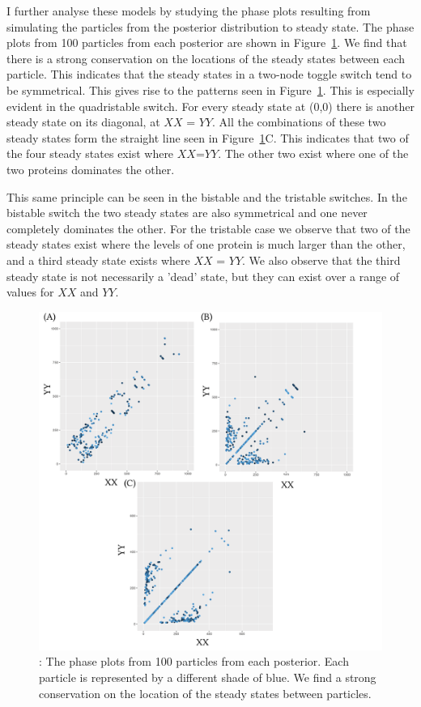 I further analyse these models by studying the phase plots resulting from simulating the particles from the posterior distribution to steady state. The phase plots from 100 particles from each posterior are shown in Figure~\ref{fig:lu_234_phase}. We find that there is a strong conservation on the locations of the steady states between each particle. This indicates that the steady states in a two-node toggle switch tend to be symmetrical. This gives rise to the patterns seen in Figure~\ref{fig:lu_234_phase}. This is especially evident in the quadristable switch.  For every steady state at (0,0) there is another steady state on its diagonal, at $XX$ = $YY$. All the combinations of these two steady states form the straight line seen in Figure~\ref{fig:lu_234_phase}C. This indicates that two of the four steady states exist where $XX$=$YY$. The other two exist where one of the two proteins dominates the other. 

This same principle can be seen in the bistable and the tristable switches. In the bistable switch the two steady states are also symmetrical and one never completely dominates the other. For the tristable case we observe that two of the steady states exist where the levels of one protein is much larger than the other, and a third steady state exists where $XX$ = $YY$. We also observe that the third steady state is not necessarily a 'dead' state, but they can exist over a range of values for $XX$ and $YY$.

\begin{figure}
	\begin{center}
		\includegraphics[width=\textwidth]{../../chapters/chapterStabilityFinder/images/LU-234-phase-all.png}
		\caption[LoF caption]{ \label{fig:lu_234_phase}: The phase plots from 100 particles from each posterior. Each particle is represented by a different shade of blue. We find a strong conservation on the location of the steady states between particles.  }
	\end{center}
\end{figure}

